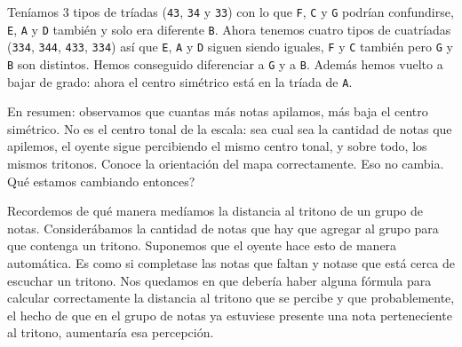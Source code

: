 \documentclass[]{article}
\begin{document}
Teníamos 3 tipos de tríadas (\texttt{43}, \texttt{34} y \texttt{33}) con lo que \texttt{F}, \texttt{C} y \texttt{G} podrían confundirse, \texttt{E}, \texttt{A} y \texttt{D} también y solo era diferente \texttt{B}. Ahora tenemos cuatro tipos de cuatríadas (\texttt{334}, \texttt{344}, \texttt{433}, \texttt{334}) así que \texttt{E}, \texttt{A} y \texttt{D} siguen siendo iguales, \texttt{F} y \texttt{C} también pero \texttt{G} y \texttt{B} son distintos. Hemos conseguido diferenciar a \texttt{G} y a \texttt{B}. Además hemos vuelto a bajar de grado: ahora el centro simétrico está en la tríada de \texttt{A}.

En resumen: observamos que cuantas más notas apilamos, más baja el centro simétrico. No es el centro tonal de la escala: sea cual sea la cantidad de notas que apilemos, el oyente sigue percibiendo el mismo centro tonal, y sobre todo, los mismos tritonos. Conoce la orientación del mapa correctamente. Eso no cambia. Qué estamos cambiando entonces?

Recordemos de qué manera medíamos la distancia al tritono de un grupo de notas. Considerábamos la cantidad de notas que hay que agregar al grupo para que contenga un tritono. Suponemos que el oyente hace esto de manera automática. Es como si completase las notas que faltan y notase que está cerca de escuchar un tritono. Nos quedamos en que debería haber alguna fórmula para calcular correctamente la distancia al tritono que se percibe y que probablemente, el hecho de que en el grupo de notas ya estuviese presente una nota perteneciente al tritono, aumentaría esa percepción.
\end{document}
